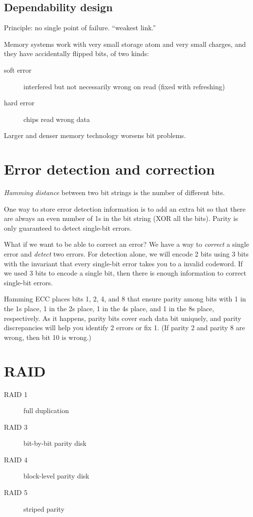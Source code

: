 \subsection{Dependability design}
Principle: no single point of failure. ``weakest link.''

Memory systems work with very small storage atom and very small charges, and they have accidentally flipped bits, of two kinds:
\begin{description}
	\item[soft error] interfered but not necessarily wrong on read (fixed with refreshing)
	\item[hard error] chips read wrong data
\end{description}
Larger and denser memory technology worsens bit problems.

\section{Error detection and correction}
\emph{Hamming distance} between two bit strings is the number of different bits.

One way to store error detection information is to add an extra bit so that there are always an even number of 1s in the bit string (XOR all the bits). Parity is only guaranteed to detect single-bit errors.

What if we want to be able to correct an error? We have a way to \emph{correct} a single error and \emph{detect} two errors. For detection alone, we will encode 2 bits using 3 bits with the invariant that every single-bit error takes you to a invalid codeword. If we used 3 bits to encode a single bit, then there is enough information to correct single-bit errors.

Hamming ECC places bits 1, 2, 4, and 8 that ensure parity among bits with 1 in the 1s place, 1 in the 2s place, 1 in the 4s place, and 1 in the 8s place, respectively. As it happens, parity bits cover each data bit uniquely, and parity discrepancies will help you identify 2 errors or fix 1. (If parity 2 and parity 8 are wrong, then bit 10 is wrong.)

\section{RAID}
\begin{description}
	\item[RAID 1] full duplication
	\item[RAID 3] bit-by-bit parity disk
	\item[RAID 4] block-level parity disk
	\item[RAID 5] striped parity
\end{description}